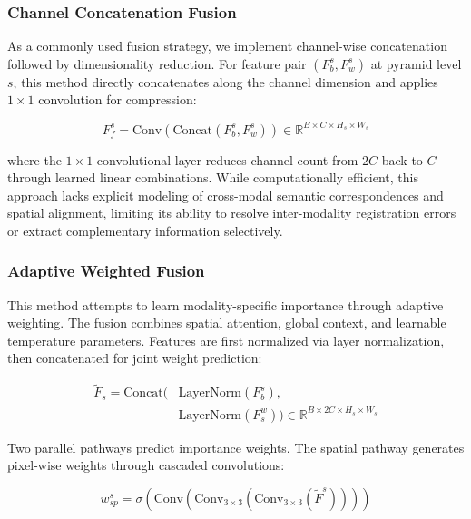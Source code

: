 \documentclass[journal,twoside,web]{ieeecolor}
\begin{document}
\subsubsection{Channel Concatenation Fusion}

As a commonly used fusion strategy, we implement channel-wise concatenation followed by dimensionality reduction. For feature pair $(F_b^s, F_w^s)$ at pyramid level $s$, this method directly concatenates along the channel dimension and applies $1 \times 1$ convolution for compression:

\begin{equation}
F_{f}^s = \text{Conv}(\text{Concat}(F_b^s, F_w^s)) \in \mathbb{R}^{B \times C \times H_s \times W_s}
\end{equation}

where the $1 \times 1$ convolutional layer reduces channel count from $2C$ back to $C$ through learned linear combinations. While computationally efficient, this approach lacks explicit modeling of cross-modal semantic correspondences and spatial alignment, limiting its ability to resolve inter-modality registration errors or extract complementary information selectively.

\subsubsection{Adaptive Weighted Fusion}

This method attempts to learn modality-specific importance through adaptive weighting. The fusion combines spatial attention, global context, and learnable temperature parameters. Features are first normalized via layer normalization, then concatenated for joint weight prediction:

\begin{equation}
\begin{split}
\tilde{F}_s = \text{Concat}(&\text{LayerNorm}(F_b^s), \\
&\text{LayerNorm}(F^w_s)) \in \mathbb{R}^{B \times 2C \times H_s \times W_s}
\end{split}
\end{equation}

Two parallel pathways predict importance weights. The spatial pathway generates pixel-wise weights through cascaded convolutions:

\begin{equation}
w^s_{sp} = \sigma(\text{Conv}(\text{Conv}_{3\times3}(\text{Conv}_{3\times3}(\tilde{F}^s))))
\end{equation}
\end{document}
